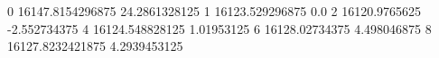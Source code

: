 0 16147.8154296875 24.2861328125
1 16123.529296875 0.0
2 16120.9765625 -2.552734375
4 16124.548828125 1.01953125
6 16128.02734375 4.498046875
8 16127.8232421875 4.2939453125
